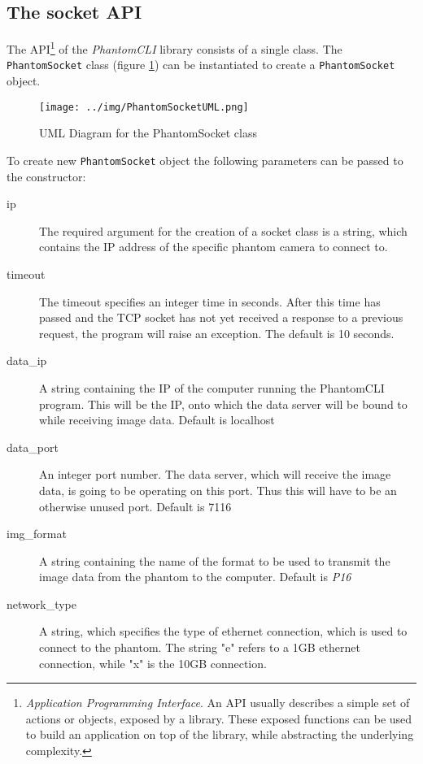 \subsection{The socket API}
The API\footnote{\textit{Application Programming Interface}. An API usually describes a simple set of actions or objects, exposed by a library. These exposed functions can be used to build an application on top of the library, while abstracting the underlying complexity.} of the \textit{PhantomCLI} library consists of a single class. The \texttt{PhantomSocket} class (figure \ref{fig:uml1}) can be instantiated to create a \texttt{PhantomSocket} object.
\begin{figure}[h]
	\caption[PhantomSocket UML]{UML Diagram for the PhantomSocket class}
	\texttt{[image: ../img/PhantomSocketUML.png]} 
	\label{fig:uml1}
\end{figure}
To create new \texttt{PhantomSocket} object the following parameters can be passed to the constructor:
\begin{description}
\item[ip] The required argument for the creation of a socket class is a string, which contains the IP address of the specific phantom camera to connect to.
\item[timeout] The timeout specifies an integer time in seconds. After this time has passed and the TCP socket has not yet received a response to a previous request, the program will raise an exception. The default is 10 seconds.
\item[data\_ip] A string containing the IP of the computer running the PhantomCLI program. This will be the IP, onto which the data server will be bound to while receiving image data. Default is localhost
\item[data\_port] An integer port number. The data server, which will receive the image data, is going to be operating on this port. Thus this will have to be an otherwise unused port. Default is 7116
\item[img\_format] A string containing the name of the format to be used to transmit the image data from the phantom to the computer. Default is \textit{P16}
\item[network\_type] A string, which specifies the type of ethernet connection, which is used to connect to the phantom. The string "e" refers to a 1GB ethernet connection, while "x" is the 10GB connection.
\end{description}
